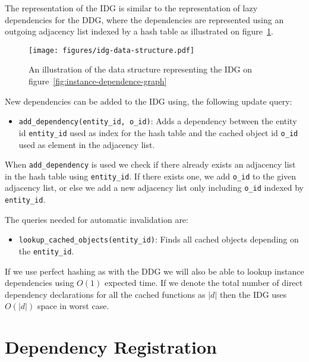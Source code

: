 The representation of the IDG is similar to the representation of lazy dependencies for the DDG, where the dependencies are represented using an outgoing adjacency list indexed by a hash table as illustrated on figure~\ref{fig:idg-data-structure}.

\begin{figure*}[ht!]
  \centering
  \texttt{[image: figures/idg-data-structure.pdf]}
  \caption{An illustration of the data structure representing the IDG on figure~\ref{fig:instance-dependence-graph}}
  \label{fig:idg-data-structure}
\end{figure*}

New dependencies can be added to the IDG using, the following update query:

\begin{itemize}
  \item \verb$add_dependency(entity_id, o_id)$: Adds a dependency between the entity id \verb$entity_id$ used as index for the hash table and the cached object id \verb$o_id$ used as element in the adjacency list.
\end{itemize}

When \verb$add_dependency$ is used we check if there already exists an adjacency list in the hash table using \verb$entity_id$. If there exists one, we add \verb$o_id$ to the given adjacency list, or else we add a new adjacency list only including \verb$o_id$ indexed by \verb$entity_id$.

The queries needed for automatic invalidation are:

\begin{itemize}
  \item \verb$lookup_cached_objects(entity_id)$: Finds all cached objects depending on the \verb$entity_id$.
\end{itemize}

If we use perfect hashing as with the DDG we will also be able to lookup instance dependencies using $O(1)$ expected time. If we denote the total number of direct dependency declarations for all the cached functions as $|d|$ then the IDG uses $O(|d|)$ space in worst case.



\section{Dependency Registration}
\label{sec:dependency-registration}

